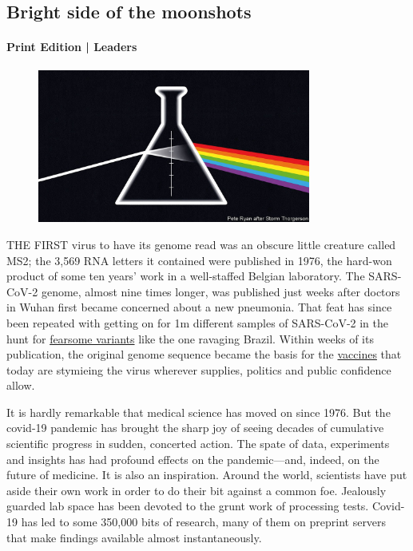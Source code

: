 \documentclass{article}
\begin{document}
\subsection{Bright side of the moonshots }
\paragraph{Print Edition | Leaders  \quad \color{gray}{Mar 27th 2021 }}
\begin{figure}[h]
\centering
\includegraphics[width=0.8\textwidth]{images/20210327_LDD001_0.jpg}
\end{figure}
\lettrine{T}HE FIRST virus to have its genome read was an obscure little creature called MS2; the 3,569 RNA letters it contained were published in 1976, the hard-won product of some ten years' work in a well-staffed Belgian laboratory. The SARS-CoV-2 genome, almost nine times longer, was published just weeks after doctors in Wuhan first became concerned about a new pneumonia. That feat has since been repeated with getting on for 1m different samples of SARS-CoV-2 in the hunt for \href{/the-americas/2021/03/27/brazils-mismanagement-of-covid-19-threatens-the-world}{fearsome variants} like the one ravaging Brazil. Within weeks of its publication, the original genome sequence became the basis for the \href{/europe/2021/03/25/europes-plans-to-restrict-vaccine-exports-endanger-itself-and-the-world}{vaccines} that today are stymieing the virus wherever supplies, politics and public confidence allow. 

It is hardly remarkable that medical science has moved on since 1976. But the covid-19 pandemic has brought the sharp joy of seeing decades of cumulative scientific progress in sudden, concerted action. The spate of data, experiments and insights has had profound effects on the pandemic---and, indeed, on the future of medicine. It is also an inspiration. Around the world, scientists have put aside their own work in order to do their bit against a common foe. Jealously guarded lab space has been devoted to the grunt work of processing tests. Covid-19 has led to some 350,000 bits of research, many of them on preprint servers that make findings available almost instantaneously. 
\end{document}
